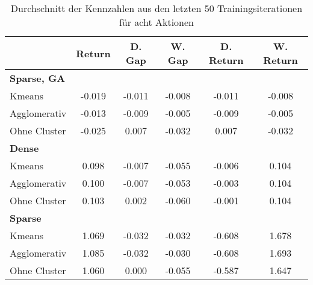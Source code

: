 \begin{table}[ht]
\centering
\caption{Durchschnitt der Kennzahlen aus den letzten 50 Trainingsiterationen für acht Aktionen}
\begin{tabular}{lccccc}
\hline
\textbf{} & \textbf{Return} & \textbf{D. Gap} & \textbf{W. Gap} & \textbf{D. Return} & \textbf{W. Return} \\
\hline
\multicolumn{6}{l}{\textbf{Sparse, GA}} \\
\hspace{1em}Kmeans & -0.019 & -0.011 & -0.008& -0.011 & -0.008 \\
\hspace{1em}Agglomerativ & -0.013 & -0.009 & -0.005& -0.009 & -0.005 \\
\hspace{1em}Ohne Cluster & -0.025 & 0.007 & -0.032& 0.007 & -0.032 \\
\hline
\multicolumn{6}{l}{\textbf{Dense}} \\
\hspace{1em}Kmeans & 0.098 & -0.007 & -0.055& -0.006 & 0.104 \\
\hspace{1em}Agglomerativ & 0.100 & -0.007 & -0.053& -0.003 & 0.104 \\
\hspace{1em}Ohne Cluster & 0.103 & 0.002 & -0.060& -0.001 & 0.104 \\
\hline
\multicolumn{6}{l}{\textbf{Sparse}} \\
\hspace{1em}Kmeans & 1.069 & -0.032 & -0.032& -0.608 & 1.678 \\
\hspace{1em}Agglomerativ & 1.085 & -0.032 & -0.030& -0.608 & 1.693 \\
\hspace{1em}Ohne Cluster & 1.060 & 0.000 & -0.055& -0.587 & 1.647 \\
\hline
\end{tabular}
\end{table}


